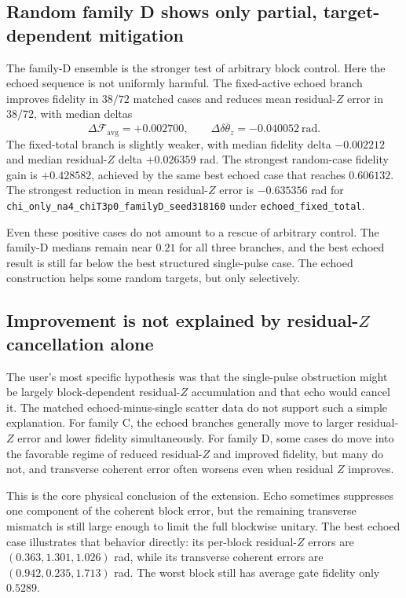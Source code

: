 \documentclass[aps,pra,twocolumn,reprint,floatfix,amsmath,amssymb]{revtex4-2}
\begin{document}
\subsection{Random family D shows only partial, target-dependent mitigation}
The family-D ensemble is the stronger test of arbitrary block control. Here the echoed sequence is not uniformly harmful. The fixed-active echoed branch improves fidelity in \(38/72\) matched cases and reduces mean residual-\(Z\) error in \(38/72\), with median deltas
\[
\Delta \mathcal{F}_{\mathrm{avg}} = +0.002700,
\qquad
\Delta \overline{\delta\theta_z} = -0.040052~\mathrm{rad}.
\]
The fixed-total branch is slightly weaker, with median fidelity delta \(-0.002212\) and median residual-\(Z\) delta \(+0.026359\) rad. The strongest random-case fidelity gain is \(+0.428582\), achieved by the same best echoed case that reaches \(0.606132\). The strongest reduction in mean residual-\(Z\) error is \(-0.635356\) rad for \texttt{chi\_only\_na4\_chiT3p0\_familyD\_seed318160} under \texttt{echoed\_fixed\_total}.

Even these positive cases do not amount to a rescue of arbitrary control. The family-D medians remain near \(0.21\) for all three branches, and the best echoed result is still far below the best structured single-pulse case. The echoed construction helps some random targets, but only selectively.

\subsection{Improvement is not explained by residual-\texorpdfstring{$Z$}{Z} cancellation alone}
The user's most specific hypothesis was that the single-pulse obstruction might be largely block-dependent residual-\(Z\) accumulation and that echo would cancel it. The matched echoed-minus-single scatter data do not support such a simple explanation. For family C, the echoed branches generally move to larger residual-\(Z\) error and lower fidelity simultaneously. For family D, some cases do move into the favorable regime of reduced residual-\(Z\) and improved fidelity, but many do not, and transverse coherent error often worsens even when residual \(Z\) improves.

This is the core physical conclusion of the extension. Echo sometimes suppresses one component of the coherent block error, but the remaining transverse mismatch is still large enough to limit the full blockwise unitary. The best echoed case illustrates that behavior directly: its per-block residual-\(Z\) errors are \((0.363, 1.301, 1.026)\) rad, while its transverse coherent errors are \((0.942, 0.235, 1.713)\) rad. The worst block still has average gate fidelity only \(0.5289\).
\end{document}
